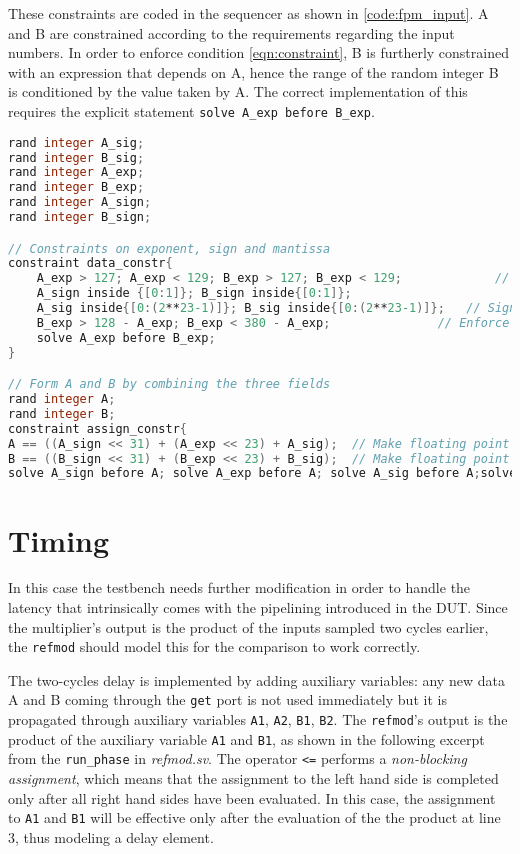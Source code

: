 These constraints are coded in the sequencer as shown in \ref{code:fpm_input}. A and B are constrained according to the requirements regarding the input numbers. In order to enforce condition \ref{eqn:constraint}, B is furtherly constrained with an expression that depends on A, hence the range of the random integer B is conditioned by the value taken by A. The correct implementation of this requires the explicit statement \texttt{solve A\_exp before B\_exp}.

\begin{lstlisting}[language = verilog, label = code:fpm_input]
rand integer A_sig;
rand integer B_sig;
rand integer A_exp;
rand integer B_exp;
rand integer A_sign;
rand integer B_sign;

// Constraints on exponent, sign and mantissa
constraint data_constr{
	A_exp > 127; A_exp < 129; B_exp > 127; B_exp < 129; 		    // Exponent
	A_sign inside {[0:1]}; B_sign inside{[0:1]}; 					 			// Sign
	A_sig inside{[0:(2**23-1)]}; B_sig inside{[0:(2**23-1)]}; 	// Significand
	B_exp > 128 - A_exp; B_exp < 380 - A_exp;  				// Enforce condition on sum of exponents
	solve A_exp before B_exp;
}

// Form A and B by combining the three fields
rand integer A;
rand integer B;
constraint assign_constr{
A == ((A_sign << 31) + (A_exp << 23) + A_sig);  // Make floating point number A
B == ((B_sign << 31) + (B_exp << 23) + B_sig);  // Make floating point number B
solve A_sign before A; solve A_exp before A; solve A_sig before A;solve B_sign before B; solve B_exp before B;solve B_sig before B;}
\end{lstlisting}


\section{Timing}
In this case the testbench needs further modification in order to handle the latency that intrinsically comes with the pipelining introduced in the DUT. Since the multiplier's output is the product of the inputs sampled two cycles earlier, the \texttt{refmod} should model this for the comparison to work correctly.

The two-cycles delay is implemented by adding auxiliary variables: any new data A and B coming through the \texttt{get} port is not used immediately but it is propagated through auxiliary variables \texttt{A1}, \texttt{A2}, \texttt{B1}, \texttt{B2}. The \texttt{refmod}'s output is the product of the auxiliary variable \texttt{A1} and \texttt{B1}, as shown in the following excerpt from the \texttt{run\_phase} in \textit{refmod.sv}. The operator \texttt{<=} performs a \textit{non-blocking assignment}, which means that the assignment to the left hand side is completed only after all right hand sides have been evaluated. In this case, the assignment to \texttt{A1} and \texttt{B1} will be effective only after the evaluation of the the product at line 3, thus modeling a delay element.

